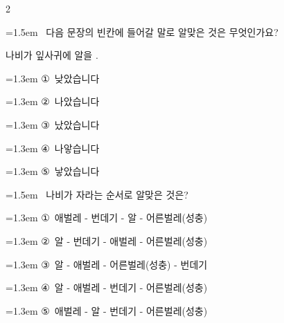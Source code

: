 \documentclass[12pt, a4paper]{article}
\begin{document}
\begin{multicols}{2}
\noindent\begin{minipage}{\columnwidth}
\vspace{2mm}
{\hangindent=1.5em  ~다음 문장의 빈칸에 들어갈 말로 알맞은 것은 무엇인가요?\par}

\vspace{1mm}
\begin{boxibox}
나비가 잎사귀에 알을 \underline{\hspace{3cm}}. \\
\end{boxibox}
\vspace{1mm}

\vspace{0.5mm}
{\hangindent=1.3em  \noindent\hspace{0.3em}①~낮았습니다\par}
{\hangindent=1.3em  \noindent\hspace{0.3em}②~나았습니다\par}
{\hangindent=1.3em  \noindent\hspace{0.3em}③~났았습니다\par}
{\hangindent=1.3em  \noindent\hspace{0.3em}④~나앟습니다\par}
{\hangindent=1.3em  \noindent\hspace{0.3em}⑤~낳았습니다\par}
\vspace{4mm}
\end{minipage}
\par

\noindent\begin{minipage}{\columnwidth}
\vspace{2mm}
{\hangindent=1.5em  ~나비가 자라는 순서로 알맞은 것은?\par}

\vspace{0.5mm}
{\hangindent=1.3em  \noindent\hspace{0.3em}①~애벌레 - 번데기 - 알 - 어른벌레(성충)\par}
{\hangindent=1.3em  \noindent\hspace{0.3em}②~알 - 번데기 - 애벌레 - 어른벌레(성충)\par}
{\hangindent=1.3em  \noindent\hspace{0.3em}③~알 - 애벌레 - 어른벌레(성충) - 번데기\par}
{\hangindent=1.3em  \noindent\hspace{0.3em}④~알 - 애벌레 - 번데기 - 어른벌레(성충)\par}
{\hangindent=1.3em  \noindent\hspace{0.3em}⑤~애벌레 - 알 - 번데기 - 어른벌레(성충)\par}
\vspace{4mm}
\end{minipage}
\par


\end{multicols}
\end{document}
